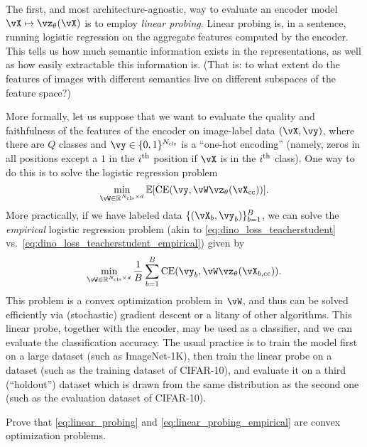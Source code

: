 \documentclass[\toplevelprefix/book-main.tex]{subfiles}
\begin{document}
The first, and most architecture-agnostic, way to evaluate an encoder model \(\vX \mapsto \vz_{\theta}(\vX)\) is to employ \textit{linear probing}. Linear probing is, in a sentence, running logistic regression on the aggregate features computed by the encoder. This tells us how much semantic information exists in the representations, as well as how easily extractable this information is. (That is: to what extent do the features of images with different semantics live on different subspaces of the feature space?)

More formally, let us suppose that we want to evaluate the quality and faithfulness of the features of the encoder on image-label data \((\vX, \vy)\), where there are \(Q\) classes and \(\vy \in \{0, 1\}^{N_{\cls}}\) is a ``one-hot encoding'' (namely, zeros in all positions except a \(1\) in the \(i^{\textnormal{th}}\) position if \(\vX\) is in the \(i^{\textnormal{th}}\) class). One way to do this is to solve the logistic regression problem 
\begin{equation}\label{eq:linear_probing}
    \min_{\vW \in \R^{N_{\cls} \times d}}\Ex[\CE(\vy, \vW \vz_{\theta}(\vX_{\cc}))].
\end{equation}
More practically, if we have labeled data \(\{(\vX_{b}, \vy_{b})\}_{b = 1}^{B}\), we can solve the \textit{empirical} logistic regression problem (akin to \eqref{eq:dino_loss_teacherstudent} vs.~\eqref{eq:dino_loss_teacherstudent_empirical}) given by 
\begin{equation}\label{eq:linear_probing_empirical}
    \min_{\vW \in \R^{N_{\cls} \times d}}\frac{1}{B}\sum_{b = 1}^{B}\CE(\vy_{b}, \vW \vz_{\theta}(\vX_{b, \cc})).
\end{equation}
This problem is a convex optimization problem in \(\vW\), and thus can be solved efficiently via (stochastic) gradient descent or a litany of other algorithms. This linear probe, together with the encoder, may be used as a classifier, and we can evaluate the classification accuracy. The usual practice is to train the model first on a large dataset (such as ImageNet-1K), then train the linear probe on a dataset (such as the training dataset of CIFAR-10), and evaluate it on a third (``holdout'') dataset which is drawn from the same distribution as the second one (such as the evaluation dataset of CIFAR-10).

\begin{exercise}
    Prove that \eqref{eq:linear_probing} and \eqref{eq:linear_probing_empirical} are convex optimization problems.
\end{exercise}
\end{document}
